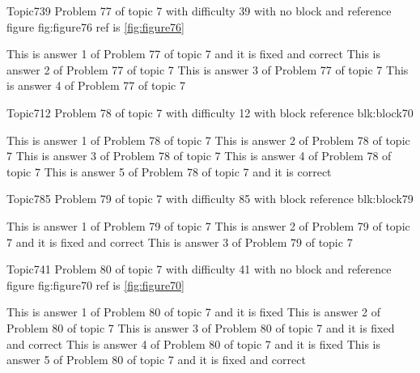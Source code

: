 \documentclass[master]{exam}
\begin{document}
\begin{problem}{Topic7}{39}
	Problem 77 of topic 7 with difficulty 39 with no block and reference figure fig:figure76 ref is \ref{fig:figure76}
	\begin{answers}
		 This is answer 1 of Problem 77 of topic 7 and it is fixed and correct
		\answer This is answer 2 of Problem 77 of topic 7 
		\answer This is answer 3 of Problem 77 of topic 7 
		\answer This is answer 4 of Problem 77 of topic 7 
	\end{answers}
\end{problem}

\begin{problem}[requires=blk:block70]{Topic7}{12}
	Problem 78 of topic 7 with difficulty 12 with block reference blk:block70
	\begin{answers}
		\answer This is answer 1 of Problem 78 of topic 7 
		\answer This is answer 2 of Problem 78 of topic 7 
		\answer This is answer 3 of Problem 78 of topic 7 
		\answer This is answer 4 of Problem 78 of topic 7 
		\answer[correct] This is answer 5 of Problem 78 of topic 7 and it is correct
	\end{answers}
\end{problem}

\begin{problem}[requires=blk:block79]{Topic7}{85}
	Problem 79 of topic 7 with difficulty 85 with block reference blk:block79
	\begin{answers}
		\answer This is answer 1 of Problem 79 of topic 7 
		 This is answer 2 of Problem 79 of topic 7 and it is fixed and correct
		\answer This is answer 3 of Problem 79 of topic 7 
	\end{answers}
\end{problem}

\begin{problem}{Topic7}{41}
	Problem 80 of topic 7 with difficulty 41 with no block and reference figure fig:figure70 ref is \ref{fig:figure70}
	\begin{answers}
		\answer[fixed] This is answer 1 of Problem 80 of topic 7 and it is fixed
		\answer This is answer 2 of Problem 80 of topic 7 
		 This is answer 3 of Problem 80 of topic 7 and it is fixed and correct
		\answer[fixed] This is answer 4 of Problem 80 of topic 7 and it is fixed
		 This is answer 5 of Problem 80 of topic 7 and it is fixed and correct
	\end{answers}
\end{problem}
\end{document}
